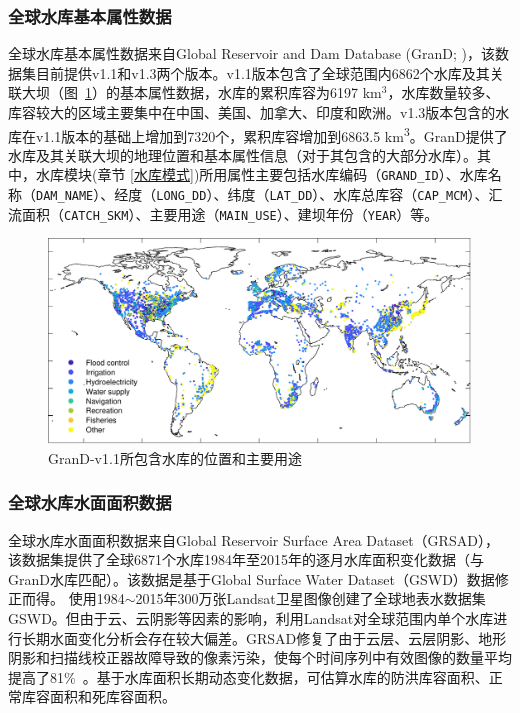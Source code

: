 \subsubsection{全球水库基本属性数据}
全球水库基本属性数据来自Global Reservoir and Dam Database (GranD; \citet{lehner2011high})，该数据集目前提供v1.1和v1.3两个版本。v1.1版本包含了全球范围内6862个水库及其关联大坝（图~\ref{fig:GranD-v1.1所包含水库的位置和主要用途}）的基本属性数据，水库的累积库容为6197 km$^{3}$，水库数量较多、库容较大的区域主要集中在中国、美国、加拿大、印度和欧洲。v1.3版本包含的水库在v1.1版本的基础上增加到7320个，累积库容增加到6863.5 \unit{km^3}。GranD提供了水库及其关联大坝的地理位置和基本属性信息（对于其包含的大部分水库）。其中，水库模块(章节 \ref{水库模式})所用属性主要包括水库编码（\texttt{GRAND\_ID}）、水库名称（\texttt{DAM\_NAME}）、经度（\texttt{LONG\_DD}）、纬度（\texttt{LAT\_DD}）、水库总库容（\texttt{CAP\_MCM}）、汇流面积（\texttt{CATCH\_SKM}）、主要用途（\texttt{MAIN\_USE}）、建坝年份（\texttt{YEAR}）等。

{
\begin{figure}[htbp]
\centering
\includegraphics[width=\textwidth]{Figures/基础数据/GranD-v1.1所包含水库的位置和主要用途.pdf}
\caption{GranD-v1.1所包含水库的位置和主要用途}
\label{fig:GranD-v1.1所包含水库的位置和主要用途}
\end{figure}
}


\subsubsection{全球水库水面面积数据}
全球水库水面面积数据来自Global Reservoir Surface Area Dataset（GRSAD），该数据集提供了全球6871个水库1984年至2015年的逐月水库面积变化数据（与GranD水库匹配）。该数据是基于Global Surface Water Dataset（GSWD）数据修正而得。\citet{pekel2016high} 使用1984$\sim$2015年300万张Landsat卫星图像创建了全球地表水数据集GSWD。但由于云、云阴影等因素的影响，利用Landsat对全球范围内单个水库进行长期水面变化分析会存在较大偏差。GRSAD修复了由于云层、云层阴影、地形阴影和扫描线校正器故障导致的像素污染，使每个时间序列中有效图像的数量平均提高了81\%~\citep{zhao2018automatic}。基于水库面积长期动态变化数据，可估算水库的防洪库容面积、正常库容面积和死库容面积。


